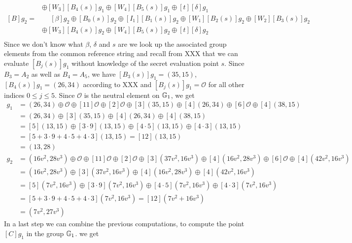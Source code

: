\begin{example}
\begin{align*}
       & \oplus [W_3][B_4(s)]g_1\oplus [W_4][B_5(s)]g_1\oplus [t][\delta]g_1\\
[B]g_2 = &\phantom{\oplus} [\beta]g_2 \oplus [B_0(s)]g_2 \oplus [I_1][B_1(s)]g_2\oplus [W_1][B_2(s)]g_2 \oplus [W_2][B_3(s)]g_2\\ 
       & \oplus [W_3][B_4(s)]g_2\oplus [W_4][B_5(s)]g_2\oplus [t][\delta]g_2\\       
\end{align*}
Since we don't know what $\beta$, $\delta$ and $s$ are we look up the associated group elements from the common reference string and recall from XXX that we can evaluate $[B_j(s)]g_1$ without knowledge of the secret evaluation point $s$. Since $B_3=A_2$ as well as $B_4=A_5$, we have $[B_3(s)]g_1=(35,15)$, $[B_4(s)]g_1=(26,34)$ according to XXX and $[B_j(s)]g_1=\mathcal{O}$ for all other indices $0\leq j\leq 5$. Since $\mathcal{O}$ is the neutral element on $\mathbb{G}_1$, we get
\begin{align*}
[B]g_1 &= (26,34) \oplus \mathcal{O}\oplus [11]\mathcal{O}\oplus [2]\mathcal{O} \oplus [3](35,15) \oplus [4](26,34)\oplus [6]\mathcal{O}\oplus [4](38,15)\\    
       &= (26,34)\oplus [3](35,15) \oplus [4](26,34)\oplus [4](38,15)\\  
       &= [5](13,15)\oplus [3\cdot 9](13,15) \oplus [4\cdot 5](13,15)\oplus [4\cdot 3](13,15)\\        
       &= [5+3\cdot 9+4\cdot 5+4\cdot 3](13,15) = [12](13,15) \\
       &= (13,28)
\end{align*}
\begin{align*}
[B]g_2 &=(16v^2,28v^3) \oplus \mathcal{O} \oplus [11]\mathcal{O}\oplus [2]\mathcal{O} \oplus [3](37v^2,16v^3)\oplus [4](16v^2,28v^3)\oplus [6]\mathcal{O}\oplus [4](42v^2,16v^3)\\    
         &=(16v^2,28v^3)\oplus [3](37v^2,16v^3)\oplus [4](16v^2,28v^3)\oplus [4](42v^2,16v^3)\\
         &=[5](7v^2,16v^3)\oplus [3\cdot 9](7v^2,16v^3)\oplus [4\cdot 5](7v^2,16v^3)\oplus [4\cdot 3](7v^2,16v^3)\\          
         &=[5+3\cdot 9+4\cdot 5+4\cdot 3](7v^2,16v^3)=[12](7v^2+16v^3)\\
         &= (7v^2,27v^3)     
\end{align*}
In a last step we can combine the previous computations, to compute the point $[C]g_1$ in the group $\mathbb{G}_1$. we get
\begin{align*}

\end{align*}
\end{example}
